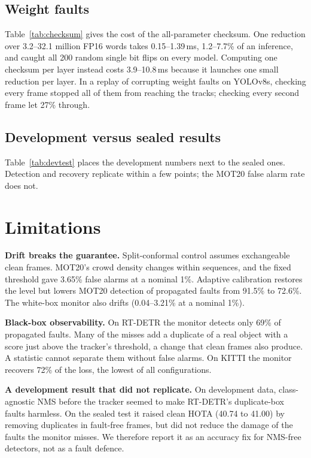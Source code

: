 \documentclass[11pt]{article}
\begin{document}
\subsection{Weight faults}
Table~\ref{tab:checksum} gives the cost of the all-parameter checksum. One reduction over 3.2--32.1 million FP16 words takes 0.15--1.39\,ms, 1.2--7.7\% of an inference, and caught all 200 random single bit flips on every model. Computing one checksum per layer instead costs 3.9--10.8\,ms because it launches one small reduction per layer. In a replay of corrupting weight faults on YOLOv8s, checking every frame stopped all of them from reaching the tracks; checking every second frame let 27\% through.

\begin{table}[t]
\centering\small
\caption{All-parameter weight checksum per frame.}
\label{tab:checksum}
\resizebox{0.85\linewidth}{!}{}
\end{table}

\subsection{Development versus sealed results}
Table~\ref{tab:devtest} places the development numbers next to the sealed ones. Detection and recovery replicate within a few points; the MOT20 false alarm rate does not.

\section{Limitations}\label{sec:limits}

\textbf{Drift breaks the guarantee.} Split-conformal control assumes exchangeable clean frames. MOT20's crowd density changes within sequences, and the fixed threshold gave 3.65\% false alarms at a nominal 1\%. Adaptive calibration restores the level but lowers MOT20 detection of propagated faults from 91.5\% to 72.6\%. The white-box monitor also drifts (0.04--3.21\% at a nominal 1\%).

\textbf{Black-box observability.} On RT-DETR the monitor detects only 69\% of propagated faults. Many of the misses add a duplicate of a real object with a score just above the tracker's threshold, a change that clean frames also produce. A statistic cannot separate them without false alarms. On KITTI the monitor recovers 72\% of the loss, the lowest of all configurations.

\textbf{A development result that did not replicate.} On development data, class-agnostic NMS before the tracker seemed to make RT-DETR's duplicate-box faults harmless. On the sealed test it raised clean HOTA (40.74 to 41.00) by removing duplicates in fault-free frames, but did not reduce the damage of the faults the monitor misses. We therefore report it as an accuracy fix for NMS-free detectors, not as a fault defence.
\end{document}
